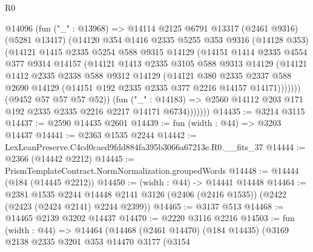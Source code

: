 \begin{lexlean}{R0}
\begin{coremodule}
                @14096
                (fun ("_" : @13968) =>
                @14114
                  @2125
                  @6791
                  @13317
                  (@2461 @9316)
                  (@5281 @13417)
                  (@14120
                    @354
                    @1416
                    @2335
                    @5255
                    @353
                    @9316
                    (@14128 @353)
                    (@14121
                      @1415
                      @2335
                      @5254
                      @588
                      @9315
                      @14129
                      (@14151
                        @1414
                        @2335
                        @4554
                        @377
                        @9314
                        @14157
                        (@14121
                          @1413
                          @2335
                          @3105
                          @588
                          @9313
                          @14129
                          (@14121
                            @1412
                            @2335
                            @2338
                            @588
                            @9312
                            @14129
                            (@14121
                              @380
                              @2335
                              @2337
                              @588
                              @2690
                              @14129
                              (@14151 @192 @2335 @2335 @377 @2216 @14157 @14171)))))))
                  (@9452 @57 @57 @57 @52))
                (fun ("_" : @14183) =>
                @2560 @14112 @203 @171 @192 @2335 @2335 @2216 @2217 @14171 @6734)))))))
@14435 := @3214 @3115
@14437 := @2590 @14435 @2601
@14439 := fun (width : @44) => @3203 @14437
@14441 := @2363 @1535 @2244
@14442 := LexLeanPreserve.C4cd0caed9fdd884fa395b3066a67213e.R0.__fits_37
@14444 := @2366 (@14442 @2212)
@14445 := PrismTemplateContract.NormNormalization.groupedWords
@14448 := @14444 (@184 (@14445 @2212))
@14450 := (width : @44) -> @14441 @14448
@14464 := @2381
    @1535
    @2244
    @14448
    @2141
    @3126
    (@2406 (@2416 @1535))
    (@2422 (@2423 (@2424 @2141) @2244 @2399))
@14465 := @3137 @513
@14468 := @14465 @2139 @3202 @14437
@14470 := @2220 @3116 @2216
@14503 := fun (width : @44) =>
  @14464
    (@14468
      (@2461 @14470)
      (@184 @14435)
      (@3169
        @2138
        @2335
        @3201
        @353
        @14470
        @3177
        (@3154

\end{coremodule}
\end{lexlean}
